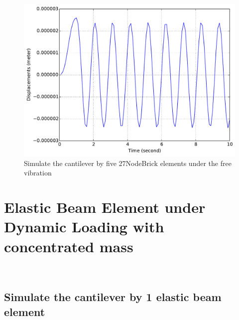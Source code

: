 \begin{figure}[!htb]
  \centering
  \includegraphics[width=12cm]{./Figure-files/_Chapter_Appendix_Illustrative_Examples/brick-5element-freeVibration.pdf}
  \caption{Simulate the cantilever by five 27NodeBrick elements under the free vibration}
  \label{fig_brick5-freevib}
\end{figure}






















\newpage
\section{Elastic Beam Element under Dynamic Loading with concentrated mass} ~ 
\subsection{Simulate the cantilever by 1 elastic beam element} 
